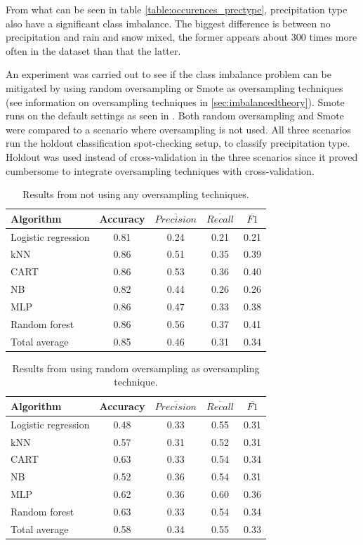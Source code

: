 	From what can be seen in table \ref{table:occurences_prectype}, precipitation type also have a significant class imbalance. The biggest difference is between no precipitation and rain and snow mixed, the former appears about 300 times more often in the dataset than that the latter.

	An experiment was carried out to see if the class imbalance problem can be mitigated by using random oversampling or Smote as oversampling techniques (see information on oversampling techniques in \ref{sec:imbalancedtheory}). Smote runs on the default settings as seen in \cite{WEBSITE:23}. Both random oversampling and Smote were compared to a scenario where oversampling is not used. All three scenarios run the holdout classification spot-checking setup, to classify precipitation type. Holdout was used instead of cross-validation in the three scenarios since it proved cumbersome to integrate oversampling techniques with cross-validation.

	\begin{table}[H]
	\centering
	\caption{Results from not using any oversampling techniques. }
		\begin{tabular}[5]{l | c | c | c | c}
    			Algorithm & Accuracy & $\overline{Precision}$ & $\overline{Recall}$ & $\overline{F1}$ \\
    			\hline
			Logistic regression & 0.81 & 0.24 & 0.21 & 0.21  \\
			kNN & 0.86 & 0.51 & 0.35 & 0.39  \\
			CART & 0.86 & 0.53 & 0.36 & 0.40 \\
			NB & 0.82 & 0.44 & 0.26 & 0.26  \\
			MLP & 0.86 & 0.47 & 0.33 &  0.38  \\
			Random forest & 0.86 & 0.56 & 0.37 & 0.41  \\
			\hline
			Total average & 0.85 & 0.46 & 0.31 & 0.34
			\label{table:no_oversampling}
		\end{tabular}
	\end{table}

	\begin{table}[H]
	\centering
	\caption{Results from using random oversampling as oversampling technique.}
		\begin{tabular}[5]{l | c | c | c | c}
    			Algorithm & Accuracy & $\overline{Precision}$ & $\overline{Recall}$ & $\overline{F1}$ \\
    			\hline
			Logistic regression & 0.48 & 0.33 & 0.55 & 0.31 \\
			kNN & 0.57 &  0.31 & 0.52 &  0.31 \\
			CART & 0.63 & 0.33 & 0.54 &  0.34 \\
			NB &  0.52 & 0.36 & 0.54 & 0.31 \\
			MLP & 0.62 & 0.36 & 0.60 & 0.36 \\
			Random forest & 0.63 & 0.33 & 0.54 &  0.34 \\
			\hline
			Total average & 0.58 & 0.34 & 0.55 & 0.33 
			\label{table:random_oversampling}
		\end{tabular}
	\end{table}

